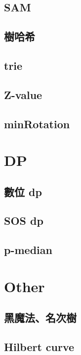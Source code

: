 \documentclass[a4paper,10pt,twocolumn,oneside]{article}
\begin{document}
\subsection{SAM}

\subsection{樹哈希}

\subsection{trie}

\subsection{Z-value}

\subsection{minRotation}

\section{DP}
\subsection{數位 dp}

\subsection{SOS dp}

\subsection{p-median}

\section{Other}
\subsection{黑魔法、名次樹}

%
\subsection{Hilbert curve}

\end{document}

